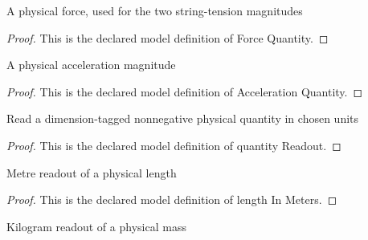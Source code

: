 \begin{definition}
  \label{def:physics:phyx-mini-0204:phyxminiproblems-problemphyxmini0204-forcequantity}
  A physical force, used for the two string-tension magnitudes
\end{definition}
\begin{proof}
  This is the declared model definition of Force Quantity.
\end{proof}
\begin{definition}
  \label{def:physics:phyx-mini-0204:phyxminiproblems-problemphyxmini0204-accelerationquantity}
  A physical acceleration magnitude
\end{definition}
\begin{proof}
  This is the declared model definition of Acceleration Quantity.
\end{proof}
\begin{definition}
  \label{def:physics:phyx-mini-0204:phyxminiproblems-problemphyxmini0204-quantityreadout}
  Read a dimension-tagged nonnegative physical quantity in chosen units
\end{definition}
\begin{proof}
  This is the declared model definition of quantity Readout.
\end{proof}
\begin{definition}
  \label{def:physics:phyx-mini-0204:phyxminiproblems-problemphyxmini0204-lengthinmeters}
  Metre readout of a physical length
\end{definition}
\begin{proof}
  This is the declared model definition of length In Meters.
\end{proof}
\begin{definition}
  \label{def:physics:phyx-mini-0204:phyxminiproblems-problemphyxmini0204-massinkilograms}
  Kilogram readout of a physical mass
\end{definition}
